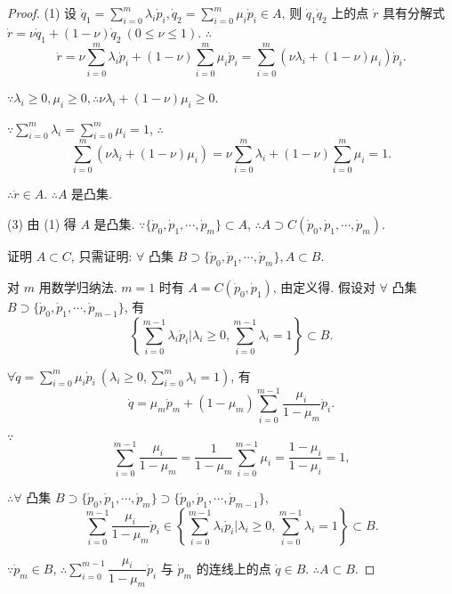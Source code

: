 \documentclass[color=black,device=normal,lang=cn,mode=geye]{elegantnote}
\begin{document}
\begin{proof}
    (1) 设 $\dot{q}_1=\sum\limits_{i=0}^m\lambda_i\dot{p}_i,\dot{q}_2=\sum\limits_{i=0}^m\mu_i\dot{p}_i\in A$, 则 $\dot{q}_1\dot{q}_2$ 上的点 $\dot{r}$ 具有分解式 $\dot{r}=\nu\dot{q}_1+(1-\nu)\dot{q}_2\ (0\leq\nu\leq1)$. $\therefore$
    \[\dot{r}=\nu\sum\limits_{i=0}^m\lambda_i\dot{p}_i+(1-\nu)\sum\limits_{i=0}^m\mu_i\dot{p}_i=\sum\limits_{i=0}^m(\nu\lambda_i+(1-\nu)\mu_i)\dot{p}_i.\]

    $\because\lambda_i\geq0,\mu_i\geq0,\therefore\nu\lambda_i+(1-\nu)\mu_i\geq0$.

    $\because\sum\limits_{i=0}^m\lambda_i=\sum\limits_{i=0}^m\mu_i=1$, $\therefore$
    \[\sum\limits_{i=0}^m(\nu\lambda_i+(1-\nu)\mu_i)=\nu\sum\limits_{i=0}^m\lambda_i+(1-\nu)\sum\limits_{i=0}^m\mu_i=1.\]

    $\therefore\dot{r}\in A$. $\therefore A$ 是凸集.

    (3) 由 (1) 得 $A$ 是凸集. $\because\{\dot{p}_0,\dot{p}_1,\cdots,\dot{p}_m\}\subset A$, $\therefore A\supset C(\dot{p}_0,\dot{p}_1,\cdots,\dot{p}_m)$.

    证明 $A\subset C$, 只需证明: $\forall$ 凸集 $B\supset\{\dot{p}_0,\dot{p}_1,\cdots,\dot{p}_m\},A\subset B$.

    对 $m$ 用数学归纳法. $m=1$ 时有 $A=C(\dot{p}_0,\dot{p}_1)$, 由定义得. 假设对 $\forall$ 凸集 $B\supset\{\dot{p}_0,\dot{p}_1,\cdots,\dot{p}_{m-1}\}$, 有
    \[\left\{\sum\limits_{i=0}^{m-1}\lambda_i\dot{p}_i\Bigg|\lambda_i\geq0,\sum\limits_{i=0}^{m-1}\lambda_i=1\right\}\subset B.\]

    $\forall\dot{q}=\sum\limits_{i=0}^m\mu_i\dot{p}_i\ \left(\lambda_i\geq0,\sum\limits_{i=0}^m\lambda_i=1\right)$, 有
    \[\dot{q}=\mu_m\dot{p}_m+(1-\mu_m)\sum\limits_{i=0}^{m-1}\dfrac{\mu_i}{1-\mu_m}\dot{p}_i.\]

    $\because$
    \[\sum\limits_{i=0}^{m-1}\dfrac{\mu_i}{1-\mu_m}=\dfrac{1}{1-\mu_m}\sum\limits_{i=0}^{m-1}\mu_i=\dfrac{1-\mu_i}{1-\mu_i}=1,\]

    $\therefore\forall$ 凸集 $B\supset\{\dot{p}_0,\dot{p}_1,\cdots,\dot{p}_m\}\supset\{\dot{p}_0,\dot{p}_1,\cdots,\dot{p}_{m-1}\}$,
    \[\sum\limits_{i=0}^{m-1}\dfrac{\mu_i}{1-\mu_m}\dot{p}_i\in\left\{\sum\limits_{i=0}^{m-1}\lambda_i\dot{p}_i\Bigg|\lambda_i\geq0,\sum\limits_{i=0}^{m-1}\lambda_i=1\right\}\subset B.\]

    $\because\dot{p}_m\in B$, $\therefore\sum\limits_{i=0}^{m-1}\dfrac{\mu_i}{1-\mu_m}\dot{p}_i$ 与 $\dot{p}_m$ 的连线上的点 $\dot{q}\in B$. $\therefore A\subset B$.
\end{proof}
\end{document}
